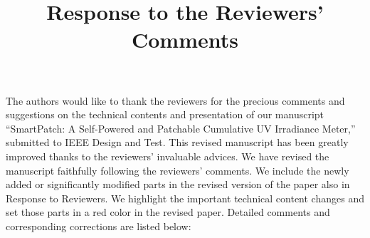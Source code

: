 \documentclass[onecolumn]{IEEEconf}
\title{Response to the Reviewers' Comments}
\begin{document}
\maketitle

The authors would like to thank the reviewers for the precious comments and suggestions on the technical contents and presentation of our manuscript ``SmartPatch: A Self-Powered and Patchable Cumulative UV Irradiance Meter,'' submitted to IEEE Design and Test. This revised manuscript has been greatly improved thanks to the reviewers’ invaluable advices. We have revised the manuscript faithfully following the reviewers’ comments. We include the newly added or significantly modified parts in the revised version of the paper also in Response to Reviewers. We highlight the important technical content changes and set those parts in a red color in the revised paper. Detailed comments and corresponding corrections are listed below:\\
\end{document}
